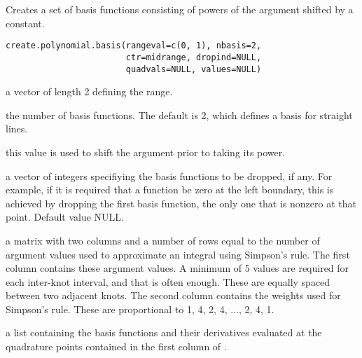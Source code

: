 \documentclass{article}
\begin{document}
\begin{Description}\relax
Creates a set of basis functions consisting of powers
of the argument shifted by a constant.
\end{Description}
\begin{Usage}
\begin{verbatim}
create.polynomial.basis(rangeval=c(0, 1), nbasis=2,
                        ctr=midrange, dropind=NULL,
                        quadvals=NULL, values=NULL)
\end{verbatim}
\end{Usage}
\begin{Arguments}
\begin{ldescription}
\item[\code{rangeval}] a vector of length 2 defining the range.

\item[\code{nbasis}] the number of basis functions. The default is 2,
which defines a basis for straight lines.

\item[\code{ctr}] this value is used to shift the argument prior to taking
its power.

\item[\code{dropind}] a vector of integers specifiying the basis functions to
be dropped, if any.  For example, if it is required that
a function be zero at the left boundary, this is achieved
by dropping the first basis function, the only one that
is nonzero at that point. Default value NULL.

\item[\code{quadvals}] a matrix with two columns and a number of rows equal to the number
of argument values used to approximate an integral using Simpson's
rule.  The first column contains these argument values.
A minimum of 5 values are required for
each inter-knot interval, and that is often enough. These
are equally spaced between two adjacent knots.
The second column contains the weights used for Simpson's
rule.  These are proportional to 1, 4, 2, 4, ..., 2, 4, 1.

\item[\code{values}] a list containing the basis functions and their derivatives
evaluated at the quadrature points contained in the first
column of .

\end{ldescription}
\end{Arguments}
\end{document}
